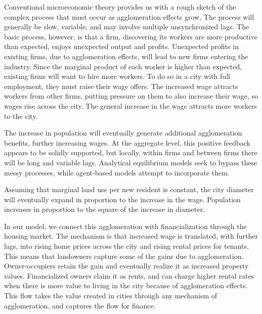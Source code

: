 Conventional microeconomic theory provides us with a rough sketch of the complex process that must occur as agglomeration effects grow. The process will generally be slow, variable, and may involve multiple unsynchronized lags. The basic process, however, is that a firm, discovering its workers are more productive than expected, enjoys unexpected output and profits. Unexpected profits in existing firms, due to agglomeration effects, will lead to new firms entering the industry. Since the marginal product of each worker is higher than expected, existing firms will want to hire more workers. To do so in a city with full employment, they must raise their wage offers.   The increased wage attracts workers from other firms, putting pressure on them to also increase their wage, so wages rise across the city. The general increase in the wage attracts more workers to the city.

The increase in population will eventually generate additional agglomeration benefits, further increasing wages. At the aggregate level, this positive feedback appears to be solidly supported, but locally, within firms and between firms there will be long and variable lags. Analytical equilibrium models seek to bypass these messy processes, while agent-based models attempt to incorporate them.



Assuming that marginal land use per new resident is constant, the city diameter will eventually expand in proportion to the increase in the wage. %
Population increases in proportion to the square of the increase in diameter. %

In our model, we connect this agglomeration with financialization through the housing market. The mechanism is that increased wage is translated, with further lags, into rising home prices across the city and rising rental prices for tenants. This means that landowners capture some of the gains due to agglomeration. Owner-occupiers retain the gain and eventually realize it as increased  property values. Financialized owners claim it as rents, and can charge higher rental rates when there is more value to living in the city because of agglomeration effects. %
This flow takes the value created in cities through any mechanism of agglomeration, and captures the flow for finance. 


